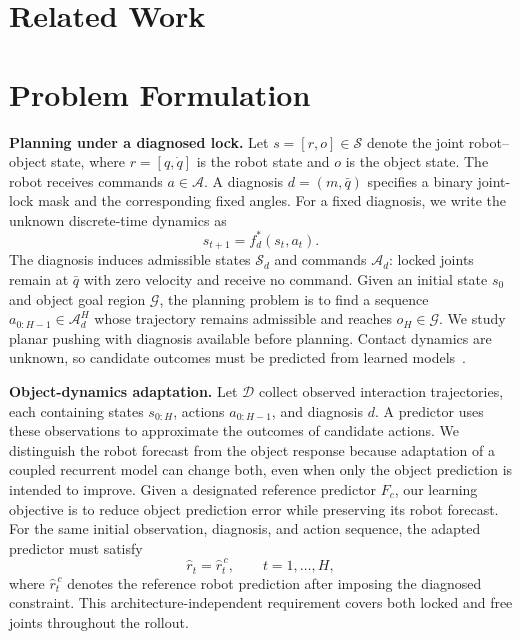 \documentclass[conference]{IEEEtran}
\begin{document}
\section{Related Work}


\section{Problem Formulation}
\noindent\hspace*{1em}\textbf{Planning under a diagnosed lock.} Let $s=[r,o]\in\mathcal S$ denote the joint robot--object state, where $r=[q,\dot q]$ is the robot state and $o$ is the object state. The robot receives commands $a\in\mathcal A$. A diagnosis $d=(m,\bar q)$ specifies a binary joint-lock mask and the corresponding fixed angles. For a fixed diagnosis, we write the unknown discrete-time dynamics as
\begin{equation}
s_{t+1}=f_d^*(s_t,a_t).
\end{equation}
The diagnosis induces admissible states $\mathcal S_d$ and commands $\mathcal A_d$: locked joints remain at $\bar q$ with zero velocity and receive no command. Given an initial state $s_0$ and object goal region $\mathcal G$, the planning problem is to find a sequence $a_{0:H-1}\in\mathcal A_d^H$ whose trajectory remains admissible and reaches $o_H\in\mathcal G$. We study planar pushing with diagnosis available before planning. Contact dynamics are unknown, so candidate outcomes must be predicted from learned models~\cite{bauza2018data,cong2020self}.

\noindent\hspace*{1em}\textbf{Object-dynamics adaptation.} Let $\mathcal D$ collect observed interaction trajectories, each containing states $s_{0:H}$, actions $a_{0:H-1}$, and diagnosis $d$. A predictor uses these observations to approximate the outcomes of candidate actions. We distinguish the robot forecast from the object response because adaptation of a coupled recurrent model can change both, even when only the object prediction is intended to improve. Given a designated reference predictor $F_c$, our learning objective is to reduce object prediction error while preserving its robot forecast. For the same initial observation, diagnosis, and action sequence, the adapted predictor must satisfy
\begin{equation}
\hat r_t=\hat r_t^{\,c},\qquad t=1,\ldots,H,
\end{equation}
where $\hat r_t^{\,c}$ denotes the reference robot prediction after imposing the diagnosed constraint. This architecture-independent requirement covers both locked and free joints throughout the rollout.
\end{document}
